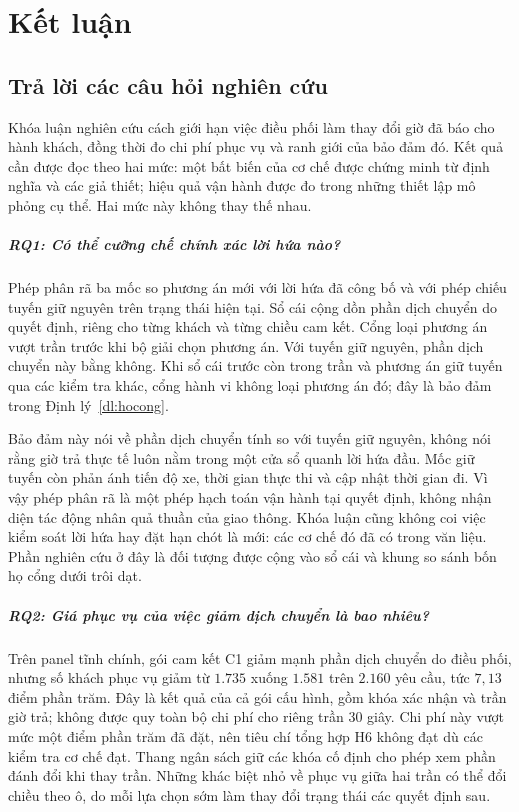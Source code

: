﻿\chapter{Kết luận}

\section{Trả lời các câu hỏi nghiên cứu}

Khóa luận nghiên cứu cách giới hạn việc điều phối làm thay đổi giờ đã báo cho hành khách,
đồng thời đo chi phí phục vụ và ranh giới của bảo đảm đó. Kết quả cần được đọc theo hai mức:
một bất biến của cơ chế được chứng minh từ định nghĩa và các giả thiết; hiệu quả vận hành
được đo trong những thiết lập mô phỏng cụ thể. Hai mức này không thay thế nhau.

\paragraph{RQ1: Có thể cưỡng chế chính xác lời hứa nào?}
Phép phân rã ba mốc so phương án mới với lời hứa đã công bố và với phép chiếu tuyến giữ
nguyên trên trạng thái hiện tại. Sổ cái cộng dồn phần dịch chuyển do quyết định, riêng cho
từng khách và từng chiều cam kết. Cổng loại phương án vượt trần trước khi bộ giải chọn
phương án. Với tuyến giữ nguyên, phần dịch chuyển này bằng không. Khi sổ cái trước còn
trong trần và phương án giữ tuyến qua các kiểm tra khác, cổng hành vi không loại phương án
đó; đây là bảo đảm trong Định lý~\ref{dl:hocong}.

Bảo đảm này nói về phần dịch chuyển tính so với tuyến giữ nguyên, không nói rằng giờ trả
thực tế luôn nằm trong một cửa sổ quanh lời hứa đầu. Mốc giữ tuyến còn phản ánh tiến độ xe,
thời gian thực thi và cập nhật thời gian đi. Vì vậy phép phân rã là một phép hạch toán vận
hành tại quyết định, không nhận diện tác động nhân quả thuần của giao thông. Khóa luận cũng
không coi việc kiểm soát lời hứa hay đặt hạn chót là mới: các cơ chế đó đã có trong văn liệu.
Phần nghiên cứu ở đây là đối tượng được cộng vào sổ cái và khung so sánh bốn họ cổng dưới
trôi dạt.

\paragraph{RQ2: Giá phục vụ của việc giảm dịch chuyển là bao nhiêu?}
Trên panel tĩnh chính, gói cam kết C1 giảm mạnh phần dịch chuyển do điều phối, nhưng số
khách phục vụ giảm từ $1.735$ xuống $1.581$ trên $2.160$ yêu cầu, tức $7{,}13$ điểm phần
trăm. Đây là kết quả của cả gói cấu hình, gồm khóa xác nhận và trần giờ trả; không được quy
toàn bộ chi phí cho riêng trần 30 giây. Chi phí này vượt mức một điểm phần trăm đã đặt,
nên tiêu chí tổng hợp H6 không đạt dù các kiểm tra cơ chế đạt. Thang ngân sách giữ các khóa cố định cho phép xem
phần đánh đổi khi thay trần. Những khác biệt nhỏ về phục vụ giữa hai trần có thể đổi chiều
theo ô, do mỗi lựa chọn sớm làm thay đổi trạng thái các quyết định sau.

